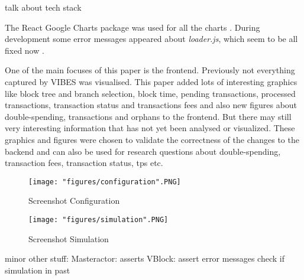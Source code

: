 talk about tech stack

The React Google Charts package was used for all the charts \cite{reactgooglecharts}. During development some error messages appeared about \textit{loader.js}, which seem to be all fixed now \cite{reactgooglechartsissue1} \cite{reactgooglechartsissue2}.

One of the main focuses of this paper is the frontend. Previously not everything captured by VIBES was visualised. This paper added lots of interesting graphics like block tree and branch selection, block time, pending transactions, processed transactions, transaction status and transactions fees and also new figures about double-spending, transactions and orphans to the frontend. But there may still very interesting information that has not yet been analysed or visualized. These graphics and figures were chosen to validate the correctness of the changes to the backend and can also be used for research questions about double-spending, transaction fees, transaction status, tps etc.

\begin{figure}
\centering
\texttt{[image: "figures/configuration".PNG]}
\caption{Screenshot Configuration
\label{fig:configuration}}
\end{figure}

\begin{figure}
\centering
\texttt{[image: "figures/simulation".PNG]}
\caption{Screenshot Simulation
\label{fig:simulation}}
\end{figure}

minor other stuff:
Masteractor: asserts
VBlock: assert error messages
check if simulation in past